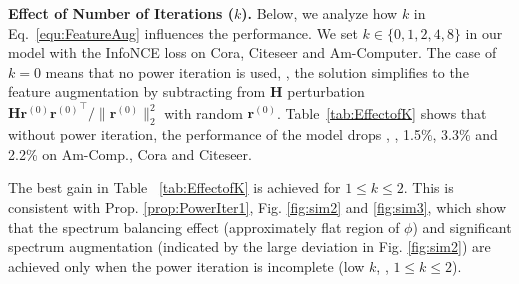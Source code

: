 \vspace{0.1cm}
\noindent\textbf{Effect of Number of Iterations ($k$).}
Below, we analyze how $k$ in Eq.~\eqref{equ:FeatureAug} influences the performance. We set $k \in \{0, 1, 2, 4, 8\}$ in our model with the InfoNCE loss on Cora, Citeseer and Am-Computer. The case of $k=0$ means that no power iteration is used, \ie, the solution simplifies to the feature augmentation by subtracting from $\mathbf{H}$ perturbation  $\mathbf{H}\mathbf{r}^{(0)}{\mathbf{r}^{(0)}}^\top\!\!/\|\mathbf{r}^{(0)}\|_2^2$ with random $\mathbf{r}^{(0)}$. 
Table~\ref{tab:EffectofK} shows that without power iteration, the performance of the model drops , \ie, 1.5\%, 3.3\% and 2.2\% on  Am-Comp., Cora and Citeseer. 
%

\vspace{-0.1cm}
\begin{tcolorbox}[width=1.0\linewidth, colframe=blackish, colback=beaublue, boxsep=0mm, arc=2mm, left=2mm, right=2mm, top=2mm, bottom=2mm]
The best gain in Table ~\ref{tab:EffectofK} is achieved for $1\leq k\leq 2$. This is consistent with Prop. \ref{prop:PowerIter1}, Fig. \ref{fig:sim2} and \ref{fig:sim3}, which show that the spectrum balancing effect (approximately flat region of $\phi$) and significant spectrum  augmentation (indicated by the large deviation in Fig. \ref{fig:sim2}) are achieved only when the power iteration is incomplete (low $k$, \ie, $1\leq k\leq 2$).
\end{tcolorbox}
\vspace{-0.1cm}


